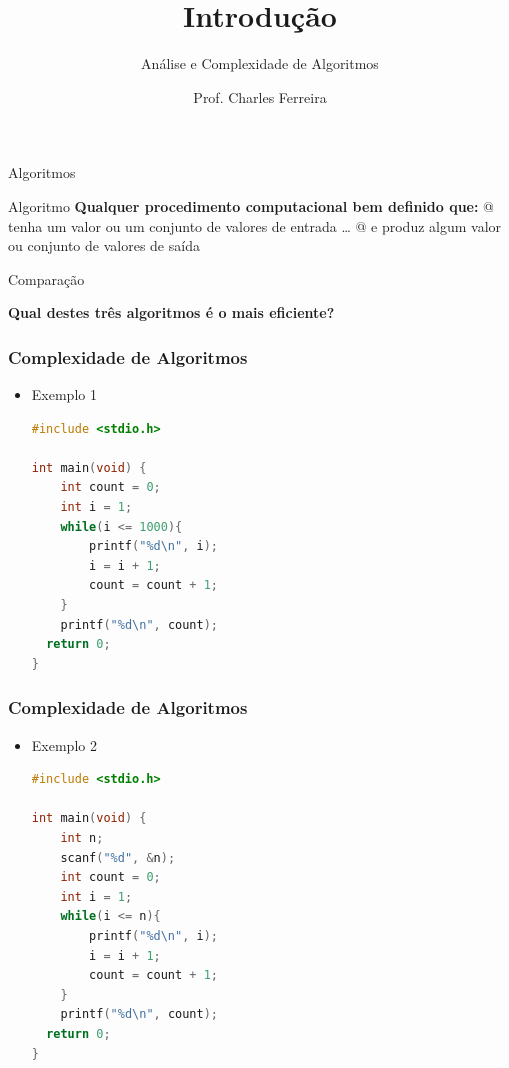 \documentclass{FEIbeamer}
\author[cferreira@fei.edu.br]{Prof. Charles Ferreira}
\title{Introdução}
\subtitle{Análise e Complexidade de Algoritmos}
\begin{document}
\begin{frame}[fragile]{Algoritmos}
\end{frame}

\begin{frame}[fragile]{Algoritmo}
    \textbf{Qualquer procedimento computacional bem definido que:}
    \bi%
    @ tenha um valor ou um conjunto de valores de entrada \ldots
    @ e produz algum valor ou conjunto de valores de saída
    \ei%
\end{frame}

\begin{frame}[fragile]{}
\end{frame}

\begin{frame}[fragile]{Comparação}

    \textbf{Qual destes três algoritmos é o mais eficiente?}

\end{frame}


\begin{frame}[fragile]
\frametitle{Complexidade de Algoritmos}
\begin{itemize}
\item Exemplo 1
\begin{lstlisting}[language=c]
#include <stdio.h>

int main(void) {
  	int count = 0;
	int i = 1;
	while(i <= 1000){
		printf("%d\n", i);
		i = i + 1;
		count = count + 1;
	}
	printf("%d\n", count);
  return 0;
}
\end{lstlisting}
\end{itemize}
\end{frame}


\begin{frame}[fragile]
\frametitle{Complexidade de Algoritmos}
\begin{itemize}
    \item Exemplo 2 
\begin{lstlisting}[language=c]
#include <stdio.h>

int main(void) {
  	int n;
	scanf("%d", &n);
	int count = 0;
	int i = 1;
	while(i <= n){
		printf("%d\n", i);
		i = i + 1;
		count = count + 1;
	}
	printf("%d\n", count);
  return 0;
}
\end{lstlisting}
\end{itemize}
\end{frame}
\end{document}
